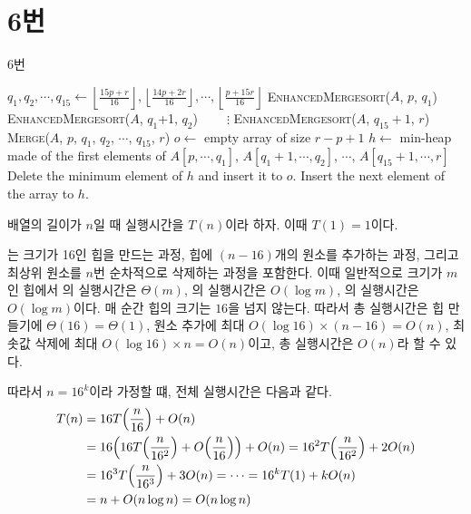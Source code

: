\documentclass[10pt]{article}
\begin{document}
\section*{6번}
\begin{algorithm}[H]
\caption{6번}\label{mergesort}
\begin{algorithmic}
     
            \State $q_1, q_2, \cdots , q_{15} \gets \left\lfloor\frac{15p+r}{16}\right\rfloor, \left\lfloor\frac{14p+2r}{16}\right\rfloor, \cdots , \left\lfloor\frac{p+15r}{16}\right\rfloor$
            \State \textsc{EnhancedMergesort}($A$, $p$, $q_1$)
            \State \textsc{EnhancedMergesort}($A$, $q_1$+1, $q_2$)
            \State $\;\;\;\;\;\;\; \vdots$
            \State \textsc{EnhancedMergesort}($A$, $q_{15}+1$, $r$)
            \State \textsc{Merge}($A$, $p$, $q_1$, $q_2$, $\cdots$, $q_{15}$, $r$)
        \EndIf
    \EndProcedure
     
        \State $o \gets$ empty array of size $r-p+1$
        \State $h \gets$ min-heap made of the first elements of $A[p, \cdots, q_1]$, $A[q_1+1, \cdots, q_2]$, $\cdots$, $A[q_{15}+1, \cdots, r]$
            \State Delete the minimum element of $h$ and insert it to $o$.
                \State Insert the next element of the array to $h$.
            \EndIf
        \EndWhile
        \EndProcedure
\end{algorithmic}
\end{algorithm}
배열의 길이가 $n$일 때 실행시간을 $T(n)$이라 하자. 이때 $T(1) = 1$이다.

\vspace{3mm}
는 크기가 16인 힙을 만드는 과정, 힙에 $(n-16)$개의 원소를 추가하는 과정, 그리고 최상위 원소를 $n$번 순차적으로 삭제하는 과정을 포함한다.
이때 일반적으로 크기가 $m$인 힙에서 의 실행시간은 $\Theta(m)$, 의 실행시간은 $O(\log{m})$, 의 실행시간은 $O(\log{m})$이다.
매 순간 힙의 크기는 $16$을 넘지 않는다. 따라서 총 실행시간은 힙 만들기에 $\Theta(16) = \Theta(1)$, 원소 추가에 최대 $O(\log{16}) \times (n-16) = O(n)$, 최솟값 삭제에 최대 $O(\log{16}) \times n = O(n)$이고, 총  실행시간은 $O(n)$라 할 수 있다.

\vspace{3mm}
따라서 $n = 16^k$이라 가정할 떄, 전체 실행시간은 다음과 같다.
\begin{align*}
    T(n) &= 16T\qty(\frac{n}{16}) + O(n) \\
    &= 16\qty(16T\qty(\frac{n}{16^2}) + O\qty(\frac{n}{16})) + O(n) = 16^2T\qty(\frac{n}{16^2}) + 2O(n) \\
    &= 16^3T\qty(\frac{n}{16^3}) + 3O(n) = \cdots = 16^kT\qty(1) + kO(n) \\
    &= n + O(n\log{n}) = O(n\log{n})
\end{align*}
\end{document}
